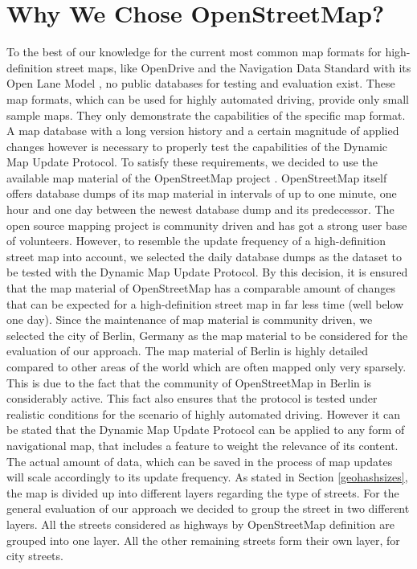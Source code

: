 \section{Why We Chose OpenStreetMap?}\label{whyosm}
To the best of our knowledge for the current most common map formats for high-definition street maps, like OpenDrive \cite{opendrive} and the Navigation Data Standard with its Open Lane Model \cite{openlanemodel}, no public databases for testing and evaluation exist. These map formats, which can be used for highly automated driving, provide only small sample maps. They only demonstrate the capabilities of the specific map format. A map database with a long version history and a certain magnitude of applied changes however is necessary to properly test the capabilities of the Dynamic Map Update Protocol. To satisfy these requirements, we decided to use the available map material of the OpenStreetMap project \cite{haklay2008openstreetmap}. OpenStreetMap itself offers database dumps of its map material in intervals of up to one minute, one hour and one day between the newest database dump and its predecessor. The open source mapping project is community driven and has got a strong user base of volunteers. However, to resemble the update frequency of a high-definition street map into account, we selected the daily database dumps as the dataset to be tested with the Dynamic Map Update Protocol. By this decision, it is ensured that the map material of OpenStreetMap has a comparable amount of changes that can be expected for a high-definition street map in far less time (well below one day). Since the maintenance of map material is community driven, we selected the city of Berlin, Germany as the map material to be considered for the evaluation of our approach. The map material of Berlin is highly detailed compared to other areas of the world which are often mapped only very sparsely. This is due to the fact that the community of OpenStreetMap in Berlin is considerably active. This fact also ensures that the protocol is tested under realistic conditions for the scenario of highly automated driving. However it can be stated that the Dynamic Map Update Protocol can be applied to any form of navigational map, that includes a feature to weight the relevance of its content. The actual amount of data, which can be saved in the process of map updates will scale accordingly to its update frequency. As stated in Section \ref{geohashsizes}, the map is divided up into different layers regarding the type of streets. For the general evaluation of our approach we decided to group the street in two different layers. All the streets considered as highways by OpenStreetMap definition are grouped into one layer. All the other remaining streets form their own layer, for city streets. \\


